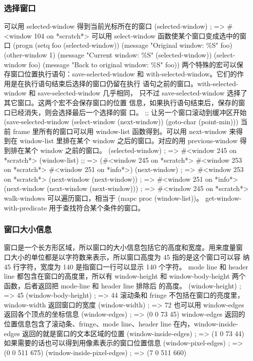 \documentclass[11pt]{ctexart}
\begin{document}
{{{{\subsubsection{选择窗口}
\label{sec:org635044d}
可以用 selected-window 得到当前光标所在的窗口
(selected-window)                       ; => \#<window 104 on *scratch*>
可以用 select-window 函数使某个窗口变成选中的窗口
(progn
(setq foo (selected-window))
(message "Original window: \%S" foo)
(other-window 1)
(message "Current window: \%S" (selected-window))
(select-window foo)
(message "Back to original window: \%S" foo))
两个特殊的宏可以保存窗口位置执行语句：save-selected-window 和 with-selected-window。它们的作用是在执行语句结束后选择的窗口仍留在执行 语句之前的窗口。with-selected-window 和 save-selected-window 几乎相同， 只不过 save-selected-window 选择了其它窗口。这两个宏不会保存窗口的位置 信息，如果执行语句结束后，保存的窗口已经消失，则会选择最后一个选择的窗 口。
;; 让另一个窗口滚动到缓冲区开始
(save-selected-window
(select-window (next-window))
(goto-char (point-min)))
当前 frame 里所有的窗口可以用 window-list 函数得到。可以用 next-window 来得到在 window-list 里排在某个 window 之后的窗口。对应的用 previous-window 得到排在某个 window 之前的窗口。
(selected-window)                       ; => \#<window 245 on *scratch*>
(window-list)
;; => (\#<window 245 on *scratch*> \#<window 253 on *scratch*> \#<window 251 on *info*>)
(next-window)                           ; => \#<window 253 on *scratch*>
(next-window (next-window))             ; => \#<window 251 on *info*>
(next-window (next-window (next-window))) ; => \#<window 245 on *scratch*>
walk-windows 可以遍历窗口，相当于 (mapc proc (window-list))。 get-window-with-predicate 用于查找符合某个条件的窗口。
\subsubsection{窗口大小信息}
\label{sec:orgffdd3e1}
窗口是一个长方形区域，所以窗口的大小信息包括它的高度和宽度。用来度量窗 口大小的单位都是以字符数来表示，所以窗口高度为 45 指的是这个窗口可以容 纳 45 行字符，宽度为 140 是指窗口一行可以显示 140 个字符。
mode line 和 header line 都包含在窗口的高度里，所以有 window-height 和 window-body-height 两个函数，后者返回把 mode-line 和 header line 排除后 的高度。
(window-height)                         ; => 45
(window-body-height)                    ; => 44
滚动条和 fringe 不包括在窗口的亮度里，window-width 返回窗口的宽度
(window-width)                          ; => 72
也可以用 window-edges 返回各个顶点的坐标信息
(window-edges)                          ; => (0 0 73 45)
window-edges 返回的位置信息包含了滚动条、fringe、mode line、header line 在内，window-inside-edges 返回的就是窗口的文本区域的位置
(window-inside-edges)                   ; => (1 0 73 44)
如果需要的话也可以得到用像素表示的窗口位置信息
(window-pixel-edges)                    ; => (0 0 511 675)
(window-inside-pixel-edges)             ; => (7 0 511 660)
}}}}
\end{document}
